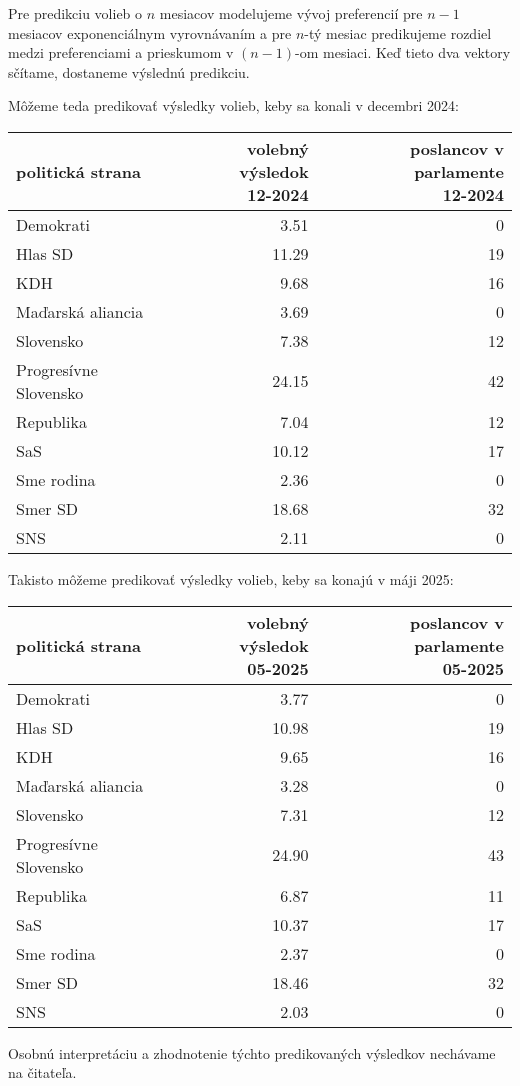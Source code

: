 \documentclass[main.tex]{subfiles}
\begin{document}
Pre predikciu volieb o $n$ mesiacov modelujeme vývoj preferencií pre $n-1$ mesiacov exponenciálnym vyrovnávaním a pre $n$-tý mesiac predikujeme rozdiel medzi preferenciami a prieskumom v $(n-1)$-om mesiaci. Keď tieto dva vektory sčítame, dostaneme výslednú predikciu.

\newpage

Môžeme teda predikovať výsledky volieb, keby sa konali v decembri 2024:

\vspace{0.5cm}
\begin{tabular}{lrr}
	\toprule
	politická strana &  \parbox{3.5cm}{\raggedleft volebný výsledok \\ 12-2024} & \parbox{5cm}{\raggedleft poslancov v parlamente \\ 12-2024} \\
	\midrule
	Demokrati & 3.51 & 0 \\
	Hlas SD & 11.29 & 19 \\
	KDH & 9.68 & 16 \\
	Maďarská aliancia & 3.69 & 0 \\
	Slovensko & 7.38 & 12 \\
	Progresívne Slovensko & 24.15 & 42 \\
	Republika & 7.04 & 12 \\
	SaS & 10.12 & 17 \\
	Sme rodina & 2.36 & 0 \\
	Smer SD & 18.68 & 32 \\
	SNS & 2.11 & 0 \\
	\bottomrule
\end{tabular}
\vspace{0.5cm}

Takisto môžeme predikovať výsledky volieb, keby sa konajú v máji 2025:

\vspace{0.5cm}
\begin{tabular}{lrr}
	\toprule
	politická strana &  \parbox{3.5cm}{\raggedleft volebný výsledok \\ 05-2025} & \parbox{5cm}{\raggedleft poslancov v parlamente \\ 05-2025} \\
	\midrule
	Demokrati & 3.77 & 0 \\
	Hlas SD & 10.98 & 19 \\
	KDH & 9.65 & 16 \\
	Maďarská aliancia & 3.28 & 0 \\
	Slovensko & 7.31 & 12 \\
	Progresívne Slovensko & 24.90 & 43 \\
	Republika & 6.87 & 11 \\
	SaS & 10.37 & 17 \\
	Sme rodina & 2.37 & 0 \\
	Smer SD & 18.46 & 32 \\
	SNS & 2.03 & 0 \\
	\bottomrule
\end{tabular}
\vspace{0.5cm}

Osobnú interpretáciu a zhodnotenie týchto predikovaných výsledkov nechávame na čitateľa.
	
\end{document}
